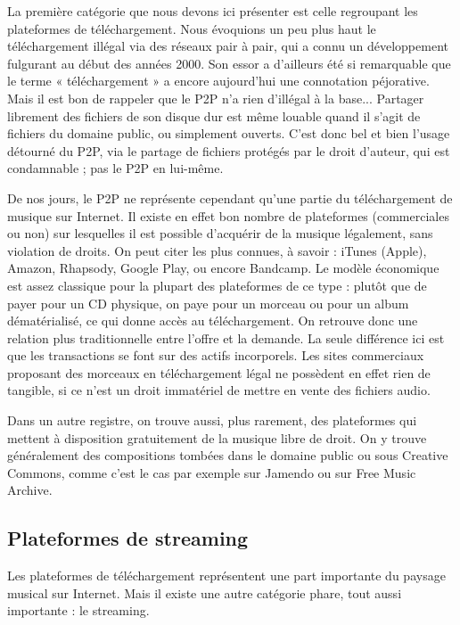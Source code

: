 \documentclass[a4paper,12pt]{article}
\begin{document}
La première catégorie que nous devons ici présenter est celle regroupant les plateformes de téléchargement. Nous évoquions un peu plus haut le téléchargement illégal via des réseaux pair à pair, qui a connu un développement fulgurant au début des années 2000. Son essor a d'ailleurs été si remarquable que le terme « téléchargement » a encore aujourd'hui une connotation péjorative. Mais il est bon de rappeler que le P2P n'a rien d'illégal à la base... Partager librement des fichiers de son disque dur est même louable quand il s'agit de fichiers du domaine public, ou simplement ouverts. C'est donc bel et bien l'usage détourné du P2P, via le partage de fichiers protégés par le droit d'auteur, qui est condamnable ; pas le P2P en lui-même.

De nos jours, le P2P ne représente cependant qu'une partie du téléchargement de musique sur Internet. Il existe en effet bon nombre de plateformes (commerciales ou non) sur lesquelles il est possible d'acquérir de la musique légalement, sans violation de droits. On peut citer les plus connues, à savoir : iTunes (Apple), Amazon, Rhapsody, Google Play, ou encore Bandcamp. Le modèle économique est assez classique pour la plupart des plateformes de ce type : plutôt que de payer pour un CD physique, on paye pour un morceau ou pour un album dématérialisé, ce qui donne accès au téléchargement. On retrouve donc une relation plus traditionnelle entre l'offre et la demande. La seule différence ici est que les transactions se font sur des actifs incorporels. Les sites commerciaux proposant des morceaux en téléchargement légal ne possèdent en effet rien de tangible, si ce n'est un droit immatériel de mettre en vente des fichiers audio.

Dans un autre registre, on trouve aussi, plus rarement, des plateformes qui mettent à disposition gratuitement de la musique libre de droit. On y trouve généralement des compositions tombées dans le domaine public ou sous Creative Commons, comme c'est le cas par exemple sur Jamendo ou sur Free Music Archive.

\subsection{Plateformes de streaming}

Les plateformes de téléchargement représentent une part importante du paysage musical sur Internet. Mais il existe une autre catégorie phare, tout aussi importante : le streaming.
\end{document}
